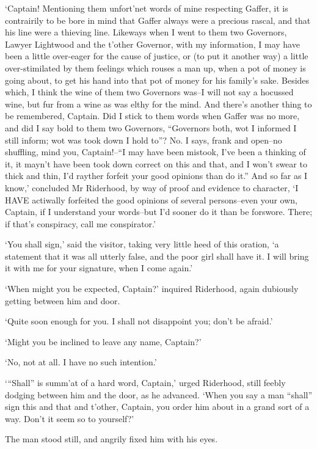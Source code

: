 ‘Captain! Mentioning them unfort’net words of mine respecting Gaffer,
it is contrairily to be bore in mind that Gaffer always were a precious
rascal, and that his line were a thieving line. Likeways when I went to
them two Governors, Lawyer Lightwood and the t’other Governor, with
my information, I may have been a little over-eager for the cause of
justice, or (to put it another way) a little over-stimilated by them
feelings which rouses a man up, when a pot of money is going about,
to get his hand into that pot of money for his family’s sake. Besides
which, I think the wine of them two Governors was--I will not say
a hocussed wine, but fur from a wine as was elthy for the mind. And
there’s another thing to be remembered, Captain. Did I stick to them
words when Gaffer was no more, and did I say bold to them two Governors,
“Governors both, wot I informed I still inform; wot was took down I hold
to”? No. I says, frank and open--no shuffling, mind you, Captain!--“I
may have been mistook, I’ve been a thinking of it, it mayn’t have been
took down correct on this and that, and I won’t swear to thick and thin,
I’d rayther forfeit your good opinions than do it.” And so far as
I know,’ concluded Mr Riderhood, by way of proof and evidence to
character, ‘I HAVE actiwally forfeited the good opinions of several
persons--even your own, Captain, if I understand your words--but I’d
sooner do it than be forswore. There; if that’s conspiracy, call me
conspirator.’

‘You shall sign,’ said the visitor, taking very little heed of this
oration, ‘a statement that it was all utterly false, and the poor girl
shall have it. I will bring it with me for your signature, when I come
again.’

‘When might you be expected, Captain?’ inquired Riderhood, again
dubiously getting between him and door.

‘Quite soon enough for you. I shall not disappoint you; don’t be
afraid.’

‘Might you be inclined to leave any name, Captain?’

‘No, not at all. I have no such intention.’

‘“Shall” is summ’at of a hard word, Captain,’ urged Riderhood, still
feebly dodging between him and the door, as he advanced. ‘When you say a
man “shall” sign this and that and t’other, Captain, you order him about
in a grand sort of a way. Don’t it seem so to yourself?’

The man stood still, and angrily fixed him with his eyes.

